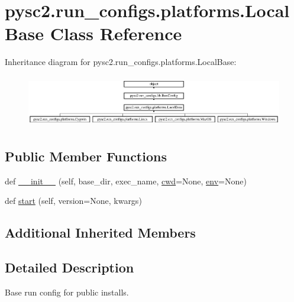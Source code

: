 \hypertarget{classpysc2_1_1run__configs_1_1platforms_1_1_local_base}{}\section{pysc2.\+run\+\_\+configs.\+platforms.\+Local\+Base Class Reference}
\label{classpysc2_1_1run__configs_1_1platforms_1_1_local_base}
Inheritance diagram for pysc2.\+run\+\_\+configs.\+platforms.\+Local\+Base\+:\begin{figure}[H]
\begin{center}
\leavevmode
\includegraphics[height=2.304527cm]{classpysc2_1_1run__configs_1_1platforms_1_1_local_base}
\end{center}
\end{figure}
\subsection*{Public Member Functions}
\begin{DoxyCompactItemize}
\item 
def \mbox{\hyperlink{classpysc2_1_1run__configs_1_1platforms_1_1_local_base_a9d70a5d03b43c39b76e413173bfb23c7}{\+\_\+\+\_\+init\+\_\+\+\_\+}} (self, base\+\_\+dir, exec\+\_\+name, \mbox{\hyperlink{classpysc2_1_1run__configs_1_1lib_1_1_run_config_af8bd9eeb877d8de7ac75b455799d88bf}{cwd}}=None, \mbox{\hyperlink{classpysc2_1_1run__configs_1_1lib_1_1_run_config_aae2166085e6fd820345e8af02743b7aa}{env}}=None)
\item 
def \mbox{\hyperlink{classpysc2_1_1run__configs_1_1platforms_1_1_local_base_a496abff1cd714158ea53bcbd05d7a4a3}{start}} (self, version=None, kwargs)
\end{DoxyCompactItemize}
\subsection*{Additional Inherited Members}


\subsection{Detailed Description}
\begin{DoxyVerb}Base run config for public installs.\end{DoxyVerb}
 

